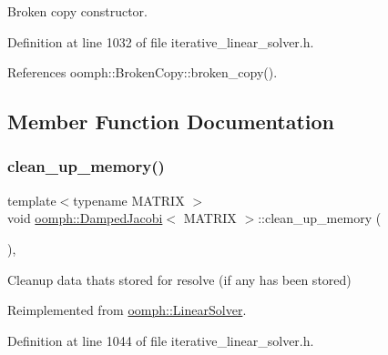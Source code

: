 Broken copy constructor. 



Definition at line 1032 of file iterative\+\_\+linear\+\_\+solver.\+h.



References oomph\+::\+Broken\+Copy\+::broken\+\_\+copy().



\subsection{Member Function Documentation}
\mbox{\label{classoomph_1_1DampedJacobi_a959c1fcafae700e8735f7100fd3670f1}} 
\subsubsection{\texorpdfstring{clean\+\_\+up\+\_\+memory()}{clean\_up\_memory()}}
{\footnotesize\ttfamily template$<$typename M\+A\+T\+R\+IX $>$ \\
void \hyperlink{classoomph_1_1DampedJacobi}{oomph\+::\+Damped\+Jacobi}$<$ M\+A\+T\+R\+IX $>$\+::clean\+\_\+up\+\_\+memory (\begin{DoxyParamCaption}{ }\end{DoxyParamCaption})\hspace{0.3cm}{\ttfamily [inline]}, {\ttfamily [virtual]}}



Cleanup data that\textquotesingle{}s stored for resolve (if any has been stored) 



Reimplemented from \hyperlink{classoomph_1_1LinearSolver_a9d66f3262e80ca06a365f98216afd85f}{oomph\+::\+Linear\+Solver}.



Definition at line 1044 of file iterative\+\_\+linear\+\_\+solver.\+h.

\mbox{\label{classoomph_1_1DampedJacobi_a5aa970c787a03bcd3127389617c64629}} 
